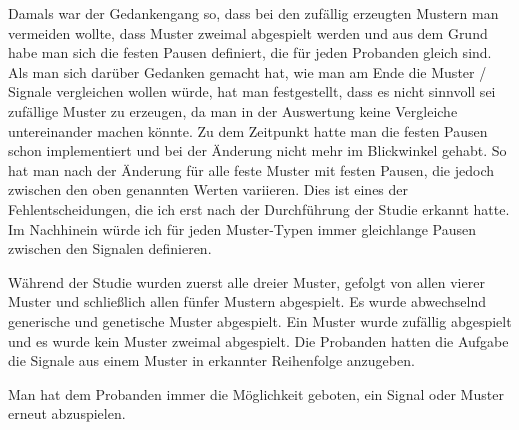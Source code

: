 Damals war der Gedankengang so, dass bei den zuf{\"a}llig erzeugten Mustern man vermeiden wollte, dass Muster zweimal abgespielt werden und aus dem Grund habe man sich die festen Pausen definiert, die f{\"u}r jeden Probanden gleich sind.
Als man sich dar{\"u}ber Gedanken gemacht hat, wie man am Ende die Muster / Signale vergleichen wollen w{\"u}rde, hat man festgestellt, dass es nicht sinnvoll sei zuf{\"a}llige Muster zu erzeugen, da man in der Auswertung keine Vergleiche untereinander machen k{\"o}nnte.
Zu dem Zeitpunkt hatte man die festen Pausen schon implementiert und bei der {\"A}nderung nicht mehr im Blickwinkel gehabt. So hat man nach der {\"A}nderung f{\"u}r alle feste Muster mit festen Pausen, die jedoch zwischen den oben genannten Werten variieren. 
Dies ist eines der Fehlentscheidungen, die ich erst nach der Durchf{\"u}hrung der Studie erkannt hatte. Im Nachhinein w{\"u}rde ich f{\"u}r jeden Muster-Typen immer gleichlange Pausen zwischen den Signalen definieren.

W{\"a}hrend der Studie wurden zuerst alle dreier Muster, gefolgt von allen vierer Muster und schlie{\ss}lich allen f{\"u}nfer Mustern abgespielt.
Es wurde abwechselnd generische und genetische Muster abgespielt. Ein Muster wurde zuf{\"a}llig abgespielt und es wurde kein Muster zweimal abgespielt. 
Die Probanden hatten die Aufgabe die Signale aus einem Muster in erkannter Reihenfolge anzugeben. 

Man hat dem Probanden immer die M{\"o}glichkeit geboten, ein Signal oder Muster erneut abzuspielen.
